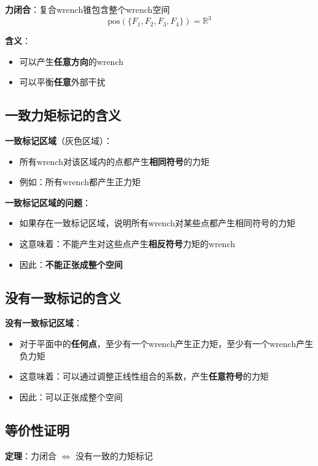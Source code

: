 \documentclass[12pt,a4paper]{article}
\begin{document}
\textbf{力闭合}：复合wrench锥包含整个wrench空间
\begin{equation}
\text{pos}(\{F_1, F_2, F_3, F_4\}) = \mathbb{R}^3
\end{equation}

\textbf{含义}：
\begin{itemize}
\item 可以产生\textbf{任意方向}的wrench
\item 可以平衡\textbf{任意}外部干扰
\end{itemize}

\subsection{一致力矩标记的含义}

\textbf{一致标记区域}（灰色区域）：
\begin{itemize}
\item 所有wrench对该区域内的点都产生\textbf{相同符号}的力矩
\item 例如：所有wrench都产生正力矩
\end{itemize}

\textbf{一致标记区域的问题}：
\begin{itemize}
\item 如果存在一致标记区域，说明所有wrench对某些点都产生相同符号的力矩
\item 这意味着：不能产生对这些点产生\textbf{相反符号}力矩的wrench
\item 因此：\textbf{不能正张成整个空间}
\end{itemize}

\subsection{没有一致标记的含义}

\textbf{没有一致标记区域}：
\begin{itemize}
\item 对于平面中的\textbf{任何点}，至少有一个wrench产生正力矩，至少有一个wrench产生负力矩
\item 这意味着：可以通过调整正线性组合的系数，产生\textbf{任意符号}的力矩
\item 因此：可以正张成整个空间
\end{itemize}

\subsection{等价性证明}

\textbf{定理}：力闭合 $\Leftrightarrow$ 没有一致的力矩标记
\end{document}
